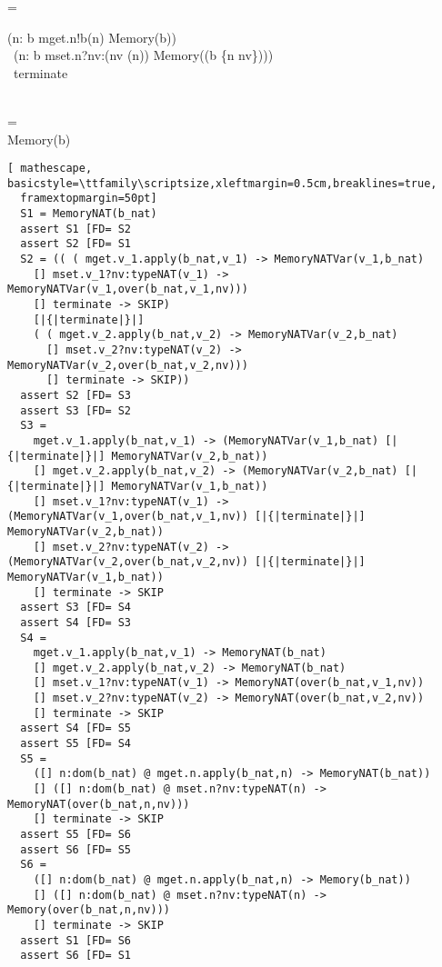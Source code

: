 \documentclass{llncs}
\begin{document}
\begin{argue}
=\\
\begin{block}
(\Extchoice n: \dom b \circdef mget.n!b(n) \then Memory(b))\\
\extchoice~(\Extchoice n: \dom b \circdef mset.n?nv:(nv \in \delta(n)) \then Memory((b \oplus \{n \mapsto nv\})))\\
 \extchoice~terminate \then \Skip
 \end{block}\\

= \\

Memory(b)
\end{argue}

\begin{lstlisting}[ mathescape, basicstyle=\ttfamily\scriptsize,xleftmargin=0.5cm,breaklines=true,
  framextopmargin=50pt]
  S1 = MemoryNAT(b_nat)
  assert S1 [FD= S2
  assert S2 [FD= S1
  S2 = (( ( mget.v_1.apply(b_nat,v_1) -> MemoryNATVar(v_1,b_nat)
    [] mset.v_1?nv:typeNAT(v_1) -> MemoryNATVar(v_1,over(b_nat,v_1,nv)))
    [] terminate -> SKIP)
    [|{|terminate|}|]
    ( ( mget.v_2.apply(b_nat,v_2) -> MemoryNATVar(v_2,b_nat)
      [] mset.v_2?nv:typeNAT(v_2) -> MemoryNATVar(v_2,over(b_nat,v_2,nv)))
      [] terminate -> SKIP))
  assert S2 [FD= S3
  assert S3 [FD= S2
  S3 =
    mget.v_1.apply(b_nat,v_1) -> (MemoryNATVar(v_1,b_nat) [|{|terminate|}|] MemoryNATVar(v_2,b_nat))
    [] mget.v_2.apply(b_nat,v_2) -> (MemoryNATVar(v_2,b_nat) [|{|terminate|}|] MemoryNATVar(v_1,b_nat))
    [] mset.v_1?nv:typeNAT(v_1) -> (MemoryNATVar(v_1,over(b_nat,v_1,nv)) [|{|terminate|}|] MemoryNATVar(v_2,b_nat))
    [] mset.v_2?nv:typeNAT(v_2) -> (MemoryNATVar(v_2,over(b_nat,v_2,nv)) [|{|terminate|}|] MemoryNATVar(v_1,b_nat))
    [] terminate -> SKIP
  assert S3 [FD= S4
  assert S4 [FD= S3
  S4 =
    mget.v_1.apply(b_nat,v_1) -> MemoryNAT(b_nat)
    [] mget.v_2.apply(b_nat,v_2) -> MemoryNAT(b_nat)
    [] mset.v_1?nv:typeNAT(v_1) -> MemoryNAT(over(b_nat,v_1,nv))
    [] mset.v_2?nv:typeNAT(v_2) -> MemoryNAT(over(b_nat,v_2,nv))
    [] terminate -> SKIP
  assert S4 [FD= S5
  assert S5 [FD= S4
  S5 =
    ([] n:dom(b_nat) @ mget.n.apply(b_nat,n) -> MemoryNAT(b_nat))
    [] ([] n:dom(b_nat) @ mset.n?nv:typeNAT(n) -> MemoryNAT(over(b_nat,n,nv)))
    [] terminate -> SKIP
  assert S5 [FD= S6
  assert S6 [FD= S5
  S6 =
    ([] n:dom(b_nat) @ mget.n.apply(b_nat,n) -> Memory(b_nat))
    [] ([] n:dom(b_nat) @ mset.n?nv:typeNAT(n) -> Memory(over(b_nat,n,nv)))
    [] terminate -> SKIP
  assert S1 [FD= S6
  assert S6 [FD= S1
\end{lstlisting}
\end{document}
